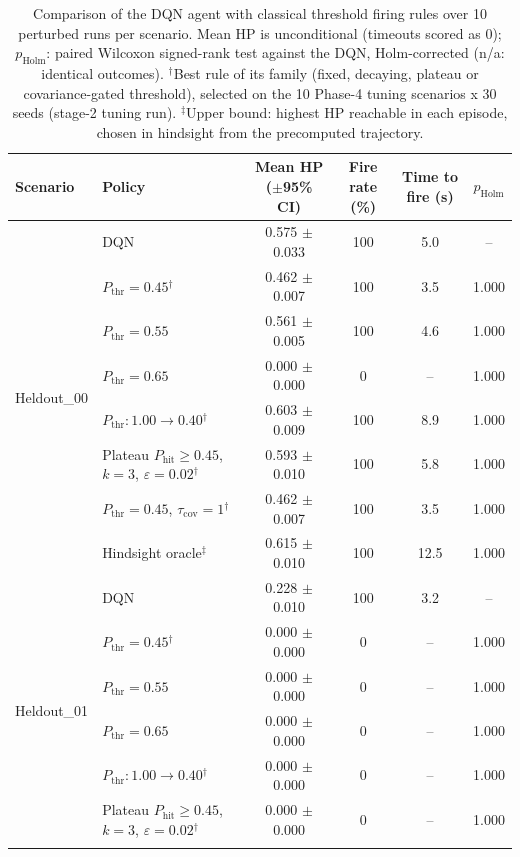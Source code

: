 \begin{table}[htbp]
\centering
\caption{Comparison of the DQN agent with classical threshold firing rules over 10 perturbed runs per scenario. Mean HP is unconditional (timeouts scored as 0); $p_{\mathrm{Holm}}$: paired Wilcoxon signed-rank test against the DQN, Holm-corrected (n/a: identical outcomes). $^{\dagger}$Best rule of its family (fixed, decaying, plateau or covariance-gated threshold), selected on the 10 Phase-4 tuning scenarios x 30 seeds (stage-2 tuning run). $^{\ddagger}$Upper bound: highest HP reachable in each episode, chosen in hindsight from the precomputed trajectory.}
\label{tab:comparison-traditional-rl}
\small
\begin{tabular}{llcccc}
\toprule
\textbf{Scenario} & \textbf{Policy} & \textbf{Mean HP ($\pm$95\% CI)} & \textbf{Fire rate (\%)} & \textbf{Time to fire (s)} & $p_{\mathrm{Holm}}$ \\
\midrule
\multirow{8}{*}{Heldout\_00} & DQN & 0.575 $\pm$ 0.033 & 100 & 5.0 & -- \\
 & $P_{\mathrm{thr}}=0.45$$^{\dagger}$ & 0.462 $\pm$ 0.007 & 100 & 3.5 & 1.000 \\
 & $P_{\mathrm{thr}}=0.55$ & 0.561 $\pm$ 0.005 & 100 & 4.6 & 1.000 \\
 & $P_{\mathrm{thr}}=0.65$ & 0.000 $\pm$ 0.000 & 0 & -- & 1.000 \\
 & $P_{\mathrm{thr}}: 1.00 \to 0.40$$^{\dagger}$ & 0.603 $\pm$ 0.009 & 100 & 8.9 & 1.000 \\
 & Plateau $P_{\mathrm{hit}}\geq0.45$, $k=3$, $\varepsilon=0.02$$^{\dagger}$ & 0.593 $\pm$ 0.010 & 100 & 5.8 & 1.000 \\
 & $P_{\mathrm{thr}}=0.45$, $\tau_{\mathrm{cov}}=1$$^{\dagger}$ & 0.462 $\pm$ 0.007 & 100 & 3.5 & 1.000 \\
 & Hindsight oracle$^{\ddagger}$ & 0.615 $\pm$ 0.010 & 100 & 12.5 & 1.000 \\
\midrule
\multirow{8}{*}{Heldout\_01} & DQN & 0.228 $\pm$ 0.010 & 100 & 3.2 & -- \\
 & $P_{\mathrm{thr}}=0.45$$^{\dagger}$ & 0.000 $\pm$ 0.000 & 0 & -- & 1.000 \\
 & $P_{\mathrm{thr}}=0.55$ & 0.000 $\pm$ 0.000 & 0 & -- & 1.000 \\
 & $P_{\mathrm{thr}}=0.65$ & 0.000 $\pm$ 0.000 & 0 & -- & 1.000 \\
 & $P_{\mathrm{thr}}: 1.00 \to 0.40$$^{\dagger}$ & 0.000 $\pm$ 0.000 & 0 & -- & 1.000 \\
 & Plateau $P_{\mathrm{hit}}\geq0.45$, $k=3$, $\varepsilon=0.02$$^{\dagger}$ & 0.000 $\pm$ 0.000 & 0 & -- & 1.000 \\
$$
\end{tabular}
\end{table}
